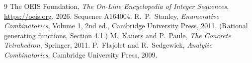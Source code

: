 \documentclass[11pt,a4paper]{article}
\theoremstyle{plain}
\theoremstyle{definition}
\begin{document}
\begin{thebibliography}{9}
 The OEIS Foundation, \emph{The On-Line Encyclopedia of Integer
Sequences}, \url{https://oeis.org}, 2026. Sequence A164004.
 R.~P.~Stanley, \emph{Enumerative Combinatorics}, Volume 1, 2nd ed.,
Cambridge University Press, 2011. (Rational generating functions, Section 4.1.)
 M.~Kauers and P.~Paule, \emph{The Concrete Tetrahedron}, Springer, 2011.
 P.~Flajolet and R.~Sedgewick, \emph{Analytic Combinatorics}, Cambridge
University Press, 2009.
\end{thebibliography}
\end{document}

